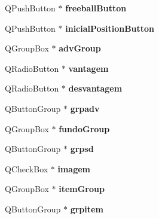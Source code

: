 \begin{DoxyCompactItemize}
\item 
Q\+Push\+Button $\ast$ {\bfseries freeball\+Button}\hypertarget{classMainWindow_a59125166de4e9af5789b110546c81850}{}\label{classMainWindow_a59125166de4e9af5789b110546c81850}

\item 
Q\+Push\+Button $\ast$ {\bfseries inicial\+Position\+Button}\hypertarget{classMainWindow_a54d2a29add16d2b77e1fb345d9aca061}{}\label{classMainWindow_a54d2a29add16d2b77e1fb345d9aca061}

\item 
Q\+Group\+Box $\ast$ {\bfseries adv\+Group}\hypertarget{classMainWindow_a19ef4e7c6015a3fa2a76f91ee2235c93}{}\label{classMainWindow_a19ef4e7c6015a3fa2a76f91ee2235c93}

\item 
Q\+Radio\+Button $\ast$ {\bfseries vantagem}\hypertarget{classMainWindow_a21780b8b8ce9dd20be5627c9bd4c59ef}{}\label{classMainWindow_a21780b8b8ce9dd20be5627c9bd4c59ef}

\item 
Q\+Radio\+Button $\ast$ {\bfseries desvantagem}\hypertarget{classMainWindow_a6135ecf17e356ac467d70e5258aaa6a1}{}\label{classMainWindow_a6135ecf17e356ac467d70e5258aaa6a1}

\item 
Q\+Button\+Group $\ast$ {\bfseries grpadv}\hypertarget{classMainWindow_afc9d19bc1cdf96260a40001eef024724}{}\label{classMainWindow_afc9d19bc1cdf96260a40001eef024724}

\item 
Q\+Group\+Box $\ast$ {\bfseries fundo\+Group}\hypertarget{classMainWindow_ac57d73844c74259a6b301731748509a2}{}\label{classMainWindow_ac57d73844c74259a6b301731748509a2}

\item 
Q\+Button\+Group $\ast$ {\bfseries grpsd}\hypertarget{classMainWindow_a900ee29d6908f5ca3505c42351749352}{}\label{classMainWindow_a900ee29d6908f5ca3505c42351749352}

\item 
Q\+Check\+Box $\ast$ {\bfseries imagem}\hypertarget{classMainWindow_a59324f41670d060e3cb97edc944bc755}{}\label{classMainWindow_a59324f41670d060e3cb97edc944bc755}

\item 
Q\+Group\+Box $\ast$ {\bfseries item\+Group}\hypertarget{classMainWindow_a6ec635201404b9690c0dc89b04b58acc}{}\label{classMainWindow_a6ec635201404b9690c0dc89b04b58acc}

\item 
Q\+Button\+Group $\ast$ {\bfseries grpitem}\hypertarget{classMainWindow_aee58bb616e4f56f945d2a0c14fc5edf7}{}\label{classMainWindow_aee58bb616e4f56f945d2a0c14fc5edf7}


\end{DoxyCompactItemize}
